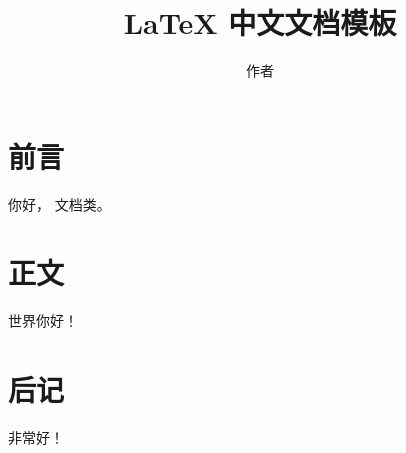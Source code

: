 \documentclass[UTF8, zihao=-4, a4paper]{ctexart}
\title{\LaTeX{} 中文文档模板}
\author{作者}
\begin{document}
\maketitle
\tableofcontents

\section{前言}

你好，\CTeX{} 文档类。

\section{正文}

世界你好！

\section{后记}

非常好！
\end{document}
